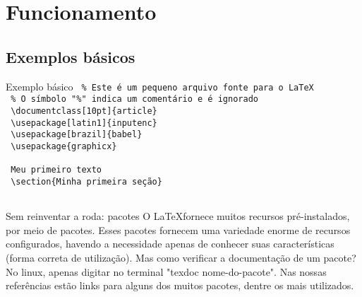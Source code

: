 \section{Funcionamento}
\subsection{Exemplos b\'asicos}

\begin{frame}[fragile]{Exemplo b\'asico}
\verb| % Este é um pequeno arquivo fonte para o LaTeX| \\
\verb| % O símbolo "%" indica um comentário e é ignorado| \\ 
\verb| \documentclass[10pt]{article}| \\
\verb| \usepackage[latin1]{inputenc}| \\
\verb| \usepackage[brazil]{babel}| \\
\verb| \usepackage{graphicx}| \\
\verb| | \\
\verb| Meu primeiro texto| \\
\verb| \section{Minha primeira seção}| \\
\verb| |
\end{frame}



\begin{frame}[fragile]{Sem reinventar a roda: pacotes}
O \LaTeX fornece muitos recursos pr\'e-instalados, por meio de pacotes. Esses pacotes fornecem uma variedade enorme de recursos configurados, havendo a necessidade apenas de conhecer suas caracter\'isticas (forma correta de utiliza{\c c}\~ao).
\newline
\newline
Mas como verificar a documenta{\c c}\~ao de um pacote? No linux, apenas digitar no terminal "texdoc nome-do-pacote".
\newline
\newline
Nas nossas refer\^encias est\~ao links para alguns dos muitos pacotes, dentre os mais utilizados.

\end{frame}



